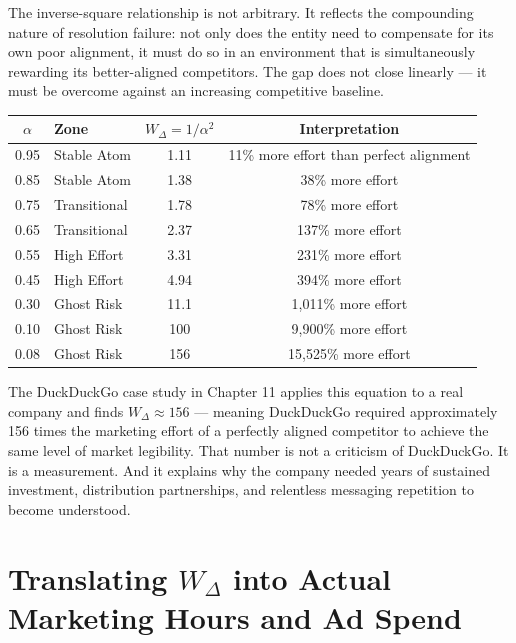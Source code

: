 \documentclass[12pt, openany]{book}
\theoremstyle{thmstyle}
\theoremstyle{defstyle}
\newcommand{\Wdelta}{W_{\Delta}}
\begin{document}
The inverse-square relationship is not arbitrary. It reflects the compounding nature of resolution failure: not only does the entity need to compensate for its own poor alignment, it must do so in an environment that is simultaneously rewarding its better-aligned competitors. The gap does not close linearly --- it must be overcome against an increasing competitive baseline.

\begin{calcbox}
\begin{center}
\begin{tabular}{clcc}
\toprule
$\alpha$ & \textbf{Zone} & $W_\Delta = 1/\alpha^2$ & \textbf{Interpretation} \\
\midrule
0.95 & Stable Atom & 1.11 & 11\% more effort than perfect alignment \\
0.85 & Stable Atom & 1.38 & 38\% more effort \\
0.75 & Transitional & 1.78 & 78\% more effort \\
0.65 & Transitional & 2.37 & 137\% more effort \\
0.55 & High Effort & 3.31 & 231\% more effort \\
0.45 & High Effort & 4.94 & 394\% more effort \\
0.30 & Ghost Risk & 11.1 & 1,011\% more effort \\
0.10 & Ghost Risk & 100 & 9,900\% more effort \\
0.08 & Ghost Risk & 156 & 15,525\% more effort \\
\bottomrule
\end{tabular}
\end{center}
\end{calcbox}

The DuckDuckGo case study in Chapter 11 applies this equation to a real company and finds $\Wdelta \approx 156$ --- meaning DuckDuckGo required approximately 156 times the marketing effort of a perfectly aligned competitor to achieve the same level of market legibility. That number is not a criticism of DuckDuckGo. It is a measurement. And it explains why the company needed years of sustained investment, distribution partnerships, and relentless messaging repetition to become understood.

\section{Translating $W_\Delta$ into Actual Marketing Hours and Ad Spend}
\end{document}

